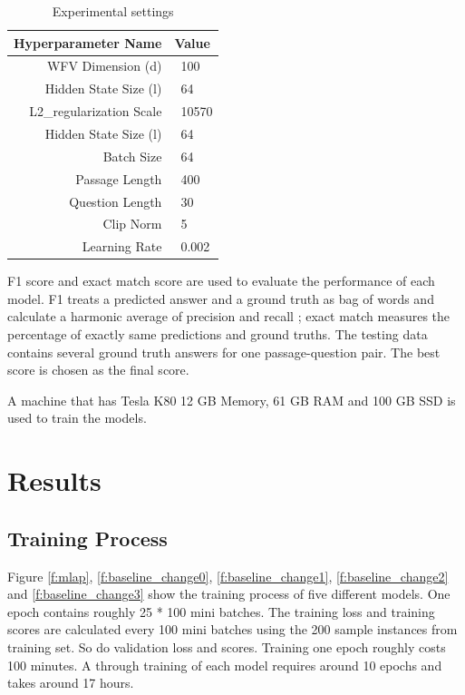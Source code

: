 \documentclass[modernstyle,12pt]{sjsuthesis}
\theoremstyle{definition}
\begin{document}
\begin{table}[htbp]\centering
  \caption{Experimental settings}
  \label{tab:settings}
  \begin{tabular}{|r|l|} \hline
    Hyperparameter Name& Value \\ \hline\hline
    WFV Dimension (d) & \ 100 \\
    Hidden State Size (l) & \ 64 \\
    L2\_regularization Scale & \ 10570\\
    Hidden State Size (l) & \ 64\\
    Batch Size & \ 64\\
    Passage Length & \ 400\\
    Question Length & \ 30\\
    Clip Norm & \ 5\\
    Learning Rate & \ 0.002 \\ \hline
  \end{tabular}
\end{table}

F1 score and exact match score are used to evaluate the performance of each model. F1 treats a predicted answer and a ground truth as bag of words and calculate a harmonic average of precision and recall ; exact match measures the percentage of exactly same predictions and ground truths. The testing data contains several ground truth answers for one passage-question pair. The best score is chosen as the final score.

A machine that has Tesla K80 12 GB Memory, 61 GB RAM and 100 GB SSD is used to train the models.

\section{Results}
\subsection{Training Process}

Figure \ref{f:mlap}, \ref{f:baseline_change0}, \ref{f:baseline_change1}, \ref{f:baseline_change2} and \ref{f:baseline_change3} show the training process of five different models. One epoch contains roughly 25 * 100 mini batches. The training loss and training scores are calculated every 100 mini batches using the 200 sample instances from training set. So do validation loss and scores. Training one epoch roughly costs 100 minutes. A through training of each model requires around 10 epochs and takes around 17 hours.
\end{document}

